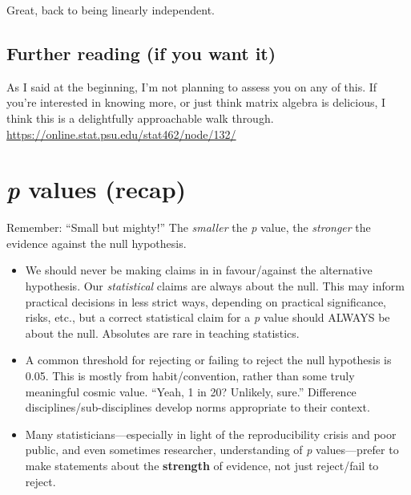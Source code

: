 \documentclass[
  openany]{book}
\providecommand{\tightlist}{%
  \setlength{\itemsep}{0pt}\setlength{\parskip}{0pt}}
\begin{document}
Great, back to being linearly independent.

\hypertarget{further-reading-if-you-want-it}{%
\subsection{Further reading (if you want it)}\label{further-reading-if-you-want-it}}

As I said at the beginning, I'm not planning to assess you on any of this. If you're interested in knowing more, or just think matrix algebra is delicious, I think this is a delightfully approachable walk through. \url{https://online.stat.psu.edu/stat462/node/132/}

\hypertarget{p-values-recap}{%
\section{\texorpdfstring{\emph{p} values (recap)}{p values (recap)}}\label{p-values-recap}}

Remember: ``Small but mighty!'' The \emph{smaller} the \emph{p} value, the \emph{stronger} the evidence against the null hypothesis.

\begin{itemize}
\tightlist
\item
  We should never be making claims in in favour/against the alternative hypothesis. Our \emph{statistical} claims are always about the null. This may inform practical decisions in less strict ways, depending on practical significance, risks, etc., but a correct statistical claim for a \emph{p} value should ALWAYS be about the null. Absolutes are rare in teaching statistics.\\
\item
  A common threshold for rejecting or failing to reject the null hypothesis is 0.05. This is mostly from habit/convention, rather than some truly meaningful cosmic value. ``Yeah, 1 in 20? Unlikely, sure.'' Difference disciplines/sub-disciplines develop norms appropriate to their context.
\item
  Many statisticians---especially in light of the reproducibility crisis and poor public, and even sometimes researcher, understanding of \emph{p} values---prefer to make statements about the \textbf{strength} of evidence, not just reject/fail to reject.
\end{itemize}
\end{document}
